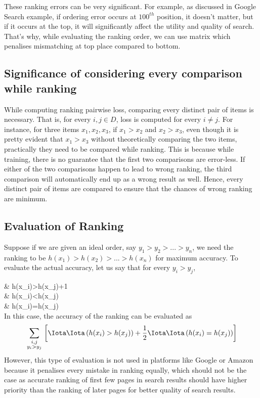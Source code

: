 \documentclass[11pt, twosides]{article}
\begin{document}
These ranking errors can be very significant. For example, as discussed in Google Search example, if ordering error occurs at ${100^{th}}$ position, it doesn't matter, but if it occurs at the top, it will significantly affect the utility and quality of search. That's why, while evaluating the ranking order, we can use matrix which penalises mismatching at top place compared to bottom.    

\subsection{Significance of considering every comparison while ranking}
While computing ranking pairwise loss, comparing every distinct pair of items is necessary. That is, for every $i,j\in D$, loss is computed for every $i\ne j$. For instance, for three items ${{x}_{1}},{{x}_{2}},{{x}_{3}}$, if ${{x}_{1}}>{{x}_{2}}$ and ${{x}_{2}}>{{x}_{3}}$, even though it is pretty evident that ${{x}_{1}}>{{x}_{3}}$ without theoretically comparing the two items, practically they need to be compared while ranking. This is because while training, there is no guarantee that the first two comparisons are error-less. If either of the two comparisons happen to lead to wrong ranking, the third comparison will automatically end up as a wrong result as well. Hence, every distinct pair of items are compared to ensure that the chances of wrong ranking are minimum. 




\subsection{Evaluation of Ranking}
Suppose if we are given an ideal order, say ${{y}_{1}}>{{y}_{2}}>...>{{y}_{n}}$, we need the ranking to be $h({{x}_{1}})>h({{x}_{2}})>...>h({{x}_{n}})$ for maximum accuracy. To evaluate the actual accuracy, let us say that for every ${{y}_{i}}>{{y}_{j}}$,

  & h({{x}_{i}})>h({{x}_{j}})\to +1 \\ 
 & h({{x}_{i}})<h({{x}_{j}}) \\ 
 & h({{x}_{i}})=h({{x}_{j}})\to {} \\ 

In this case, the accuracy of the ranking can be evaluated as
	\[\sum\limits_{\begin{smallmatrix} 
 i,j \\ 
 {{y}_{i}}>{{y}_{j}} 
\end{smallmatrix}}^{{}}{\left[ \Iota \Iota \left( h({{x}_{i}})>h({{x}_{j}}) \right)+\frac{1}{2}\Iota \Iota \left( h({{x}_{i}})=h({{x}_{j}}) \right) \right]}\]
However, this type of evaluation is not used in platforms like Google or Amazon because it penalises every mistake in ranking equally, which should not be the case as accurate ranking of first few pages in search results should have higher priority than the ranking of later pages for better quality of search results.
\end{document}
